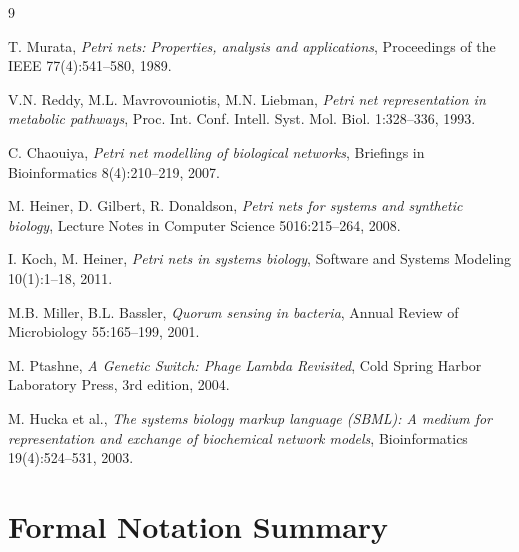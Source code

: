 \documentclass[11pt]{article}
\begin{document}

\begin{thebibliography}{9}

T. Murata,
\textit{Petri nets: Properties, analysis and applications},
Proceedings of the IEEE 77(4):541--580, 1989.

V.N. Reddy, M.L. Mavrovouniotis, M.N. Liebman,
\textit{Petri net representation in metabolic pathways},
Proc. Int. Conf. Intell. Syst. Mol. Biol. 1:328--336, 1993.

C. Chaouiya,
\textit{Petri net modelling of biological networks},
Briefings in Bioinformatics 8(4):210--219, 2007.

M. Heiner, D. Gilbert, R. Donaldson,
\textit{Petri nets for systems and synthetic biology},
Lecture Notes in Computer Science 5016:215--264, 2008.

I. Koch, M. Heiner,
\textit{Petri nets in systems biology},
Software and Systems Modeling 10(1):1--18, 2011.

M.B. Miller, B.L. Bassler,
\textit{Quorum sensing in bacteria},
Annual Review of Microbiology 55:165--199, 2001.

M. Ptashne,
\textit{A Genetic Switch: Phage Lambda Revisited},
Cold Spring Harbor Laboratory Press, 3rd edition, 2004.

M. Hucka et al.,
\textit{The systems biology markup language (SBML): A medium for representation and exchange of biochemical network models},
Bioinformatics 19(4):524--531, 2003.

\end{thebibliography}

\appendix

\section{Formal Notation Summary}
\end{document}
